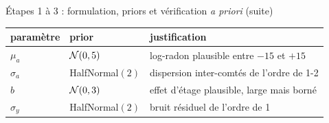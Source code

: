 \begin{frame}{Étapes 1 à 3 : formulation, priors et vérification \emph{a priori} (suite)}
\begin{kbox}
\footnotesize\begin{tabular}{@{}p{1.2cm}p{1.7cm}p{2.8cm}@{}}
\toprule
paramètre & prior & justification \\
\midrule
$\mu_a$ & $\mathcal{N}(0, 5)$ & log-radon plausible entre $-15$ et $+15$ \\
$\sigma_a$ & HalfNormal$(2)$ & dispersion inter-comtés de l'ordre de 1-2 \\
$b$ & $\mathcal{N}(0, 3)$ & effet d'étage plausible, large mais borné \\
$\sigma_y$ & HalfNormal$(2)$ & bruit résiduel de l'ordre de 1 \\
\bottomrule
\end{tabular}
\end{kbox}
\end{frame}

